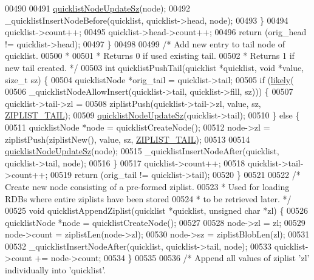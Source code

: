 \begin{DoxyCode}
{00490 
00491         \hyperlink{quicklist_8c_a03a3947a9423d234923343702619c553}{quicklistNodeUpdateSz}(node);
00492         \_quicklistInsertNodeBefore(quicklist, quicklist->head, node);
00493     \}
00494     quicklist->count++;
00495     quicklist->head->count++;
00496     \textcolor{keywordflow}{return} (orig\_head != quicklist->head);
00497 \}
00498 
00499 \textcolor{comment}{/* Add new entry to tail node of quicklist.}
00500 \textcolor{comment}{ *}
00501 \textcolor{comment}{ * Returns 0 if used existing tail.}
00502 \textcolor{comment}{ * Returns 1 if new tail created. */}
00503 \textcolor{keywordtype}{int} quicklistPushTail(quicklist *quicklist, \textcolor{keywordtype}{void} *value, size\_t sz) \{
00504     quicklistNode *orig\_tail = quicklist->tail;
00505     \textcolor{keywordflow}{if} (\hyperlink{quicklist_8c_a217a0bd562b98ae8c2ffce44935351e1}{likely}(
00506             \_quicklistNodeAllowInsert(quicklist->tail, quicklist->fill, sz))) \{
00507         quicklist->tail->zl =
00508             ziplistPush(quicklist->tail->zl, value, sz, \hyperlink{ziplist_8h_a25d058a2c2c0db0f131f84d23ede6ba2}{ZIPLIST\_TAIL});
00509         \hyperlink{quicklist_8c_a03a3947a9423d234923343702619c553}{quicklistNodeUpdateSz}(quicklist->tail);
00510     \} \textcolor{keywordflow}{else} \{
00511         quicklistNode *node = quicklistCreateNode();
00512         node->zl = ziplistPush(ziplistNew(), value, sz, \hyperlink{ziplist_8h_a25d058a2c2c0db0f131f84d23ede6ba2}{ZIPLIST\_TAIL});
00513 
00514         \hyperlink{quicklist_8c_a03a3947a9423d234923343702619c553}{quicklistNodeUpdateSz}(node);
00515         \_quicklistInsertNodeAfter(quicklist, quicklist->tail, node);
00516     \}
00517     quicklist->count++;
00518     quicklist->tail->count++;
00519     \textcolor{keywordflow}{return} (orig\_tail != quicklist->tail);
00520 \}
00521 
00522 \textcolor{comment}{/* Create new node consisting of a pre-formed ziplist.}
00523 \textcolor{comment}{ * Used for loading RDBs where entire ziplists have been stored}
00524 \textcolor{comment}{ * to be retrieved later. */}
00525 \textcolor{keywordtype}{void} quicklistAppendZiplist(quicklist *quicklist, \textcolor{keywordtype}{unsigned} \textcolor{keywordtype}{char} *zl) \{
00526     quicklistNode *node = quicklistCreateNode();
00527 
00528     node->zl = zl;
00529     node->count = ziplistLen(node->zl);
00530     node->sz = ziplistBlobLen(zl);
00531 
00532     \_quicklistInsertNodeAfter(quicklist, quicklist->tail, node);
00533     quicklist->count += node->count;
00534 \}
00535 
00536 \textcolor{comment}{/* Append all values of ziplist 'zl' individually into 'quicklist'.}
}
\end{DoxyCode}
